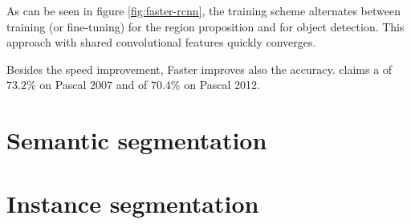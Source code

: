 As can be seen in figure \ref{fig:faster-rcnn}, the training scheme alternates between training (or fine-tuning) for the region proposition and for object detection. This approach with shared convolutional features quickly converges.

Besides the speed improvement, Faster  improves also the accuracy. \cite{faster-rcnn} claims a  of $73.2 \%$ on Pascal  2007 and of $70.4 \%$ on Pascal  2012.


\section{Semantic segmentation}
\label{semantic-segmentation}


\section{Instance segmentation}
\label{instance-segmentation}


